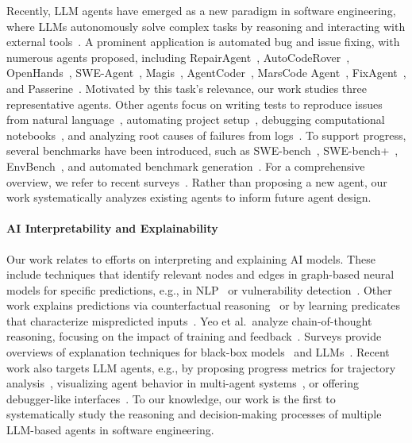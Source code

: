 \documentclass[conference,10pt]{IEEEtran}
\theoremstyle{definition}        %
\begin{document}
Recently, LLM agents have emerged as a new paradigm in software engineering, where LLMs autonomously solve complex tasks by reasoning and interacting with external tools~\cite{AgenticAISE2025}.
A prominent application is automated bug and issue fixing, with numerous agents proposed, including
RepairAgent~\cite{icse2025-RepairAgent},
AutoCodeRover~\cite{zhang2024autocoderover},
OpenHands~\cite{wang2024openhands},
SWE-Agent~\cite{Yang2024a},
Magis~\cite{Tao2024},
AgentCoder~\cite{Huang2024},
MarsCode Agent~\cite{Liu2024a},
FixAgent~\cite{Lee2024}, and 
Passerine~\cite{Rondon2025}.
Motivated by this task's relevance, our work studies three representative agents.
Other agents focus on writing tests to reproduce issues from natural language~\cite{Muendler2024,Ahmed2024,Issue2Test_arXiv2025,Cheng2025},
automating project setup~\cite{issta2025_ExecutionAgent,Milliken2024,hu2025llm},
debugging computational notebooks~\cite{Grotov2024}, and
analyzing root causes of failures from logs~\cite{Roy2024}.
To support progress, several benchmarks have been introduced, such as SWE-bench~\cite{Jimenez2023}, SWE-bench+~\cite{Aleithan2024}, Env\-Bench~\cite{Eliseeva2025}, and automated benchmark generation~\cite{Yang2025}.
For a comprehensive overview, we refer to recent surveys~\cite{wang2024agents,jin2024llms}.
Rather than proposing a new agent, our work systematically analyzes existing agents to inform future agent design.

\paragraph{AI Interpretability and Explainability}

Our work relates to efforts on interpreting and explaining AI models.
These include techniques that identify relevant nodes and edges in graph-based neural models for specific predictions, e.g., in NLP~\cite{ying2019gnnexplainer,Schlichtkrull2021} or vulnerability detection~\cite{Li2021c}.
Other work explains predictions via counterfactual reasoning~\cite{Cito2022} or by learning predicates that characterize mispredicted inputs~\cite{Cito2021}.
Yeo et al.\ analyze chain-of-thought reasoning, focusing on the impact of training and feedback~\cite{yeo2025demystifying}.
Surveys provide overviews of explanation techniques for black-box models~\cite{Guidotti2019} and LLMs~\cite{survey_explain_llm}.
Recent work also targets LLM agents, e.g., by proposing progress metrics for trajectory analysis~\cite{chang2024agentboard}, visualizing agent behavior in multi-agent systems~\cite{lu2024agentlens}, or offering debugger-like interfaces~\cite{Epperson2025}.
To our knowledge, our work is the first to systematically study the reasoning and decision-making processes of multiple LLM-based agents in software engineering.
\end{document}
